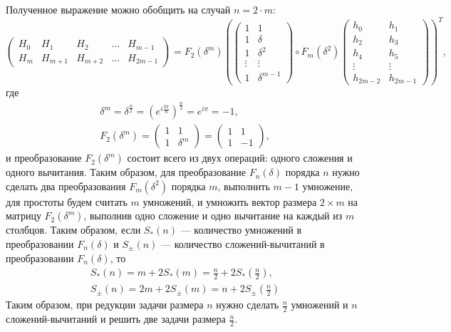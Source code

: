 Полученное выражение можно обобщить на случай $n=2 \cdot m$:
\[
    \begin{pmatrix}
        H_0 & H_1     & H_2     & \dots & H_{m-1}  \\
        H_m & H_{m+1} & H_{m+2} & \dots & H_{2m-1}
    \end{pmatrix}
    =
    F_2(\delta^{m})
    \left (
    \begin{pmatrix}
        1      & 1        \\
        1      & \delta   \\
        1      & \delta^2 \\
        \vdots & \vdots   \\
        1      & \delta^{m-1}
    \end{pmatrix}
    \circ
    F_m(\delta^2)
    \begin{pmatrix}
        h_0        & h_1      \\
        h_2        & h_3      \\
        h_4        & h_5      \\
        \vdots     & \vdots   \\
        h_{2m - 2} & h_{2m-1}
    \end{pmatrix}
    \right )^T ,
\]
где
\begin{gather*}
    \delta^m
    = \delta^\frac{n}{2}
    = \left ( e^{i \frac{2 \pi}{n}}\right )^\frac{n}{2}
    = e^{i \pi}
    = -1 , \\
    F_2(\delta^m)
    = \begin{pmatrix}
        1 & 1 \\
        1 & \delta^m
    \end{pmatrix}
    = \begin{pmatrix}
        1 & 1 \\
        1 & -1
    \end{pmatrix} ,
\end{gather*}
и преобразование $F_2(\delta^m)$ состоит всего из двух операций: одного сложения и одного вычитания. Таким образом, для преобразование $F_n(\delta)$
порядка $n$ нужно сделать два преобразования $F_m(\delta^2)$ порядка $m$, выполнить $m-1$ умножение, для простоты будем считать $m$ умножений, и 
умножить вектор размера $2 \times m$ на матрицу $F_2(\delta^m)$, выполнив одно сложение и одно вычитание на каждый из $m$ столбцов. Таким образом,
если $S_*(n)$ --- количество умножений в преобразовании $F_n(\delta)$ и $S_\pm(n)$ --- количество сложений-вычитаний в преобразовании $F_n(\delta)$,
то 
\begin{gather*}
    S_*(n)
    = m + 2 S_*(m)
    = \frac{n}{2} + 2 S_* \left( \frac{n}{2} \right) , \\
    S_\pm(n)
    = 2 m + 2 S_\pm(m)
    = n + 2 S_\pm \left( \frac{n}{2} \right)
\end{gather*}
Таким образом, при редукции задачи размера $n$ нужно сделать $\frac{n}{2}$ умножений и $n$ сложений-вычитаний и решить две задачи размера $\frac{n}{2}$.

